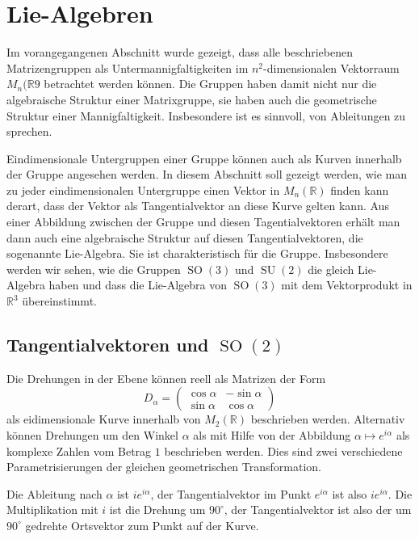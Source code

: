%
%
%
\section{Lie-Algebren
\label{buch:section:lie-algebren}}
Im vorangegangenen Abschnitt wurde gezeigt, dass alle beschriebenen
Matrizengruppen als Untermannigfaltigkeiten im $n^2$-dimensionalen
Vektorraum $M_n(\mathbb{R}9$ betrachtet werden können.
Die Gruppen haben damit nicht nur die algebraische Struktur einer
Matrixgruppe, sie haben auch die geometrische Struktur einer 
Mannigfaltigkeit.
Insbesondere ist es sinnvoll, von Ableitungen zu sprechen.

Eindimensionale Untergruppen einer Gruppe können auch als Kurven
innerhalb der Gruppe angesehen werden.
In diesem Abschnitt soll gezeigt werden, wie man zu jeder eindimensionalen
Untergruppe einen Vektor in $M_n(\mathbb{R})$ finden kann derart, dass
der Vektor als Tangentialvektor an diese Kurve gelten kann.
Aus einer Abbildung zwischen der Gruppe und diesen Tagentialvektoren
erhält man dann auch eine algebraische Struktur auf diesen Tangentialvektoren,
die sogenannte Lie-Algebra.
Sie ist charakteristisch für die Gruppe.
Insbesondere werden wir sehen, wie die Gruppen $\operatorname{SO}(3)$ 
und $\operatorname{SU}(2)$ die gleich Lie-Algebra haben und dass die
Lie-Algebra von $\operatorname{SO}(3)$ mit dem Vektorprodukt in $\mathbb{R}^3$
übereinstimmt.

%
%
\subsection{Tangentialvektoren und $\operatorname{SO}(2)$}
Die Drehungen in der Ebene können reell als Matrizen der Form
\[
D_{\alpha}
=
\begin{pmatrix}
\cos\alpha&-\sin\alpha\\
\sin\alpha& \cos\alpha
\end{pmatrix}
\]
als eidimensionale Kurve innerhalb von $M_2(\mathbb{R})$ beschrieben
werden.
Alternativ können Drehungen um den Winkel $\alpha$ als mit Hilfe von
der Abbildung
$
\alpha\mapsto e^{i\alpha}
$
als komplexe Zahlen vom Betrag $1$ beschrieben werden.
Dies sind zwei verschiedene Parametrisierungen der gleichen
geometrischen Transformation.

Die Ableitung nach $\alpha$ ist $ie^{i\alpha}$, der Tangentialvektor
im Punkt $e^{i\alpha}$ ist also $ie^{i\alpha}$.
Die Multiplikation mit $i$ ist die Drehung um $90^\circ$, der Tangentialvektor
ist also der um $90^\circ$ gedrehte Ortsvektor zum Punkt auf der Kurve.

